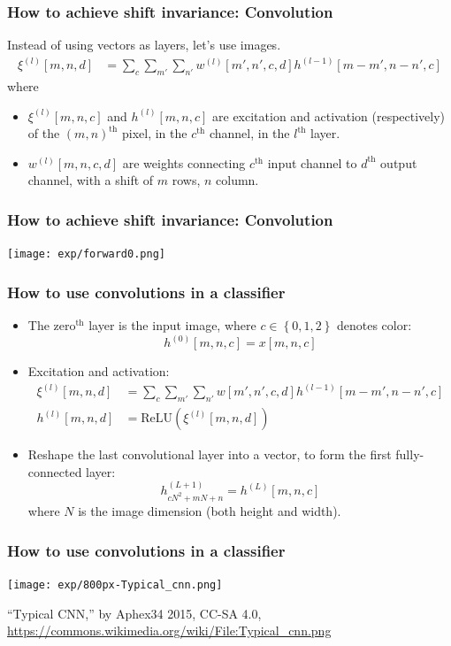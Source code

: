 \documentclass{beamer}
\begin{document}
\begin{frame}
  \frametitle{How to achieve shift invariance: Convolution}

  Instead of using vectors as layers, let's use images.
  \begin{align*}
    \xi^{(l)}[m,n,d] &= \sum_c\sum_{m'}\sum_{n'} w^{(l)}[m',n',c,d]h^{(l-1)}[m-m',n-n',c]
  \end{align*}
  where
  \begin{itemize}
  \item $\xi^{(l)}[m,n,c]$ and $h^{(l)}[m,n,c]$ are excitation and
    activation (respectively) of the $(m,n)^{\textrm{th}}$ pixel, in
    the $c^{\textrm{th}}$ channel, in the $l^{\textrm{th}}$ layer.
  \item $w^{(l)}[m,n,c,d]$ are weights connecting $c^{\textrm{th}}$
    input channel to $d^{\textrm{th}}$ output channel, with a shift of
    $m$ rows, $n$ column.
  \end{itemize}
\end{frame}

\begin{frame}
  \frametitle{How to achieve shift invariance: Convolution}

  \centerline{\texttt{[image: exp/forward0.png]}}
\end{frame}

\begin{frame}
  \frametitle{How to use convolutions in a classifier}
  \begin{itemize}
  \item The zero$^{\textrm{th}}$ layer is the input image, where
    $c\in\left\{0,1,2\right\}$ denotes color:
    \[
    h^{(0)}[m,n,c] = x[m,n,c]
    \]
  \item Excitation and activation:
    \begin{align*}
      \xi^{(l)}[m,n,d] &= \sum_c\sum_{m'}\sum_{n'} w[m',n',c,d]h^{(l-1)}[m-m',n-n',c]\\
      h^{(l)}[m,n,d] &= \mbox{ReLU}\left(\xi^{(l)}[m,n,d]\right)
    \end{align*}
  \item Reshape the last convolutional layer into a vector, to form
    the first fully-connected layer:
    \[
    h^{(L+1)}_{cN^2+mN+n} = h^{(L)}[m,n,c]
    \]
    where $N$ is the image dimension  (both height and width).
  \end{itemize}
\end{frame}
      
\begin{frame}
  \frametitle{How to use convolutions in a classifier}

  \centerline{\texttt{[image: exp/800px-Typical\_cnn.png]}}
  \begin{tiny}
    ``Typical CNN,'' by Aphex34 2015, CC-SA 4.0,
    \url{https://commons.wikimedia.org/wiki/File:Typical_cnn.png}
  \end{tiny}
\end{frame}
\end{document}
